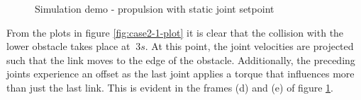 \begin{figure}
    \hfil

    \caption{Simulation demo - propulsion with static joint setpoint}
    \label{fig:case2-1}
\end{figure}

From the plots in figure \ref{fig:case2-1-plot} it is clear that the collision with the lower obstacle takes place at $~3 s$. At this point, the joint velocities are projected such that the link moves to the edge of the obstacle. Additionally, the preceding joints experience an offset as the last joint applies a torque that influences more than just the last link. This is evident in the frames (d) and (e) of figure \ref{fig:case2-1}.

